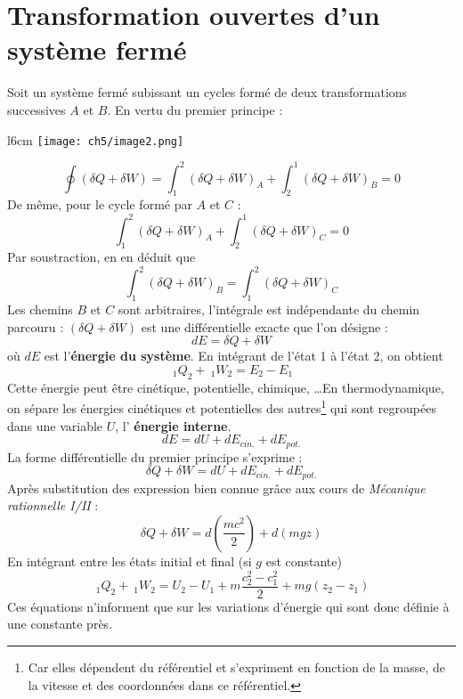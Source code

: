 \section{Transformation ouvertes d'un système fermé}
Soit un système fermé subissant un cycles formé de deux transformations 
successives $A$ et $B$. En vertu du premier principe :\\
\begin{wrapfigure}[9]{l}{6cm}
	\vspace{-7mm}
	\texttt{[image: ch5/image2.png]}
\end{wrapfigure}
\vspace{-1cm}
\begin{equation}
	\oint (\delta Q + \delta W) = \int_1^2 (\delta Q + \delta W)_A + \int_2^1 
	(\delta Q + \delta W)_B = 0
\end{equation}
De même, pour le cycle formé par $A$ et $C$ :
\begin{equation}
	\int_1^2 (\delta Q + \delta W)_A + \int_2^1 (\delta Q + \delta W)_C = 0
\end{equation}
Par soustraction, en en déduit que
\begin{equation}
	\int_1^2 (\delta Q + \delta W)_B = \int_1^2 (\delta Q + \delta W)_C
\end{equation}
Les chemins $B$ et $C$ sont arbitraires, l'intégrale est indépendante 
du chemin parcouru : $(\delta Q + \delta W)$ est une différentielle 
exacte que l'on désigne :
\begin{equation}
	dE = \delta Q + \delta W
\end{equation}
où $dE$ est l'\textbf{énergie du système}. En intégrant de l'état 1 à 
l'état 2, on obtient
\begin{equation}
	\ _1Q_2 + \ _1W_2 = E_2-E_1
\end{equation}
Cette énergie peut être cinétique, potentielle, chimique, \dots En 
thermodynamique, on sépare les énergies cinétiques et potentielles 
des autres\footnote{Car elles dépendent du référentiel et s'expriment 
	en fonction de la masse, de la vitesse et des coordonnées dans ce 
	référentiel.} qui sont regroupées dans une variable $U$, l'\textbf{
énergie interne}.
\begin{equation}
	dE = dU + dE_{cin.} + dE_{pot.}
\end{equation}
La forme différentielle du premier principe s'exprime :
\begin{equation}
	\delta Q + \delta W = dU + dE_{cin.} + dE_{pot.}
\end{equation}
Après substitution des expression bien connue grâce aux cours de \textit{
Mécanique rationnelle I/II} : 
\begin{equation}
	\delta Q + \delta W = d\left(\frac{mc^2}{2}\right) + d(mgz)
\end{equation}
En intégrant entre les états initial et final (si $g$ est constante)
\begin{equation}
	\ _1Q_2 + \ _1W_2 = U_2 - U_1 + m\frac{c_2^2-c_1^2}{2}+mg(z_2-z_1)
\end{equation}
Ces équations n'informent que sur les variations d'énergie qui sont 
donc définie à une constante près.

